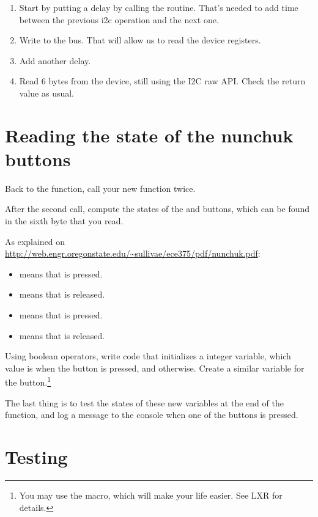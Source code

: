 \begin{enumerate}
\item Start by putting a  delay by calling the
       routine. That's needed to add time between the
      previous i2c operation and the next one.
\item Write  to the bus. That will allow us to read
      the device registers.
\item Add another  delay.
\item Read 6 bytes from the device, still using the I2C raw API.
      Check the return value as usual. 
\end{enumerate}

\section{Reading the state of the nunchuk buttons}

Back to the  function, call your new function twice.

After the second call, compute the states of the  and 
buttons, which can be found in the sixth byte that you read.

As explained on
\url{http://web.engr.oregonstate.edu/~sullivae/ece375/pdf/nunchuk.pdf}:

\begin{itemize}
\item {} means that  is pressed. 
\item {} means that  is released. 
\item {} means that  is pressed. 
\item {} means that  is released. 
\end{itemize}

Using boolean operators, write code that initializes a 
integer variable, which value is  when the  button is
pressed, and  otherwise. Create a similar 
variable for the  button.\footnote{You may use the 
macro, which will make your life easier. See LXR for details.}

The last thing is to test the states of these new variables at the end
of the  function, and log a message to the console
when one of the buttons is pressed.

\section{Testing}

